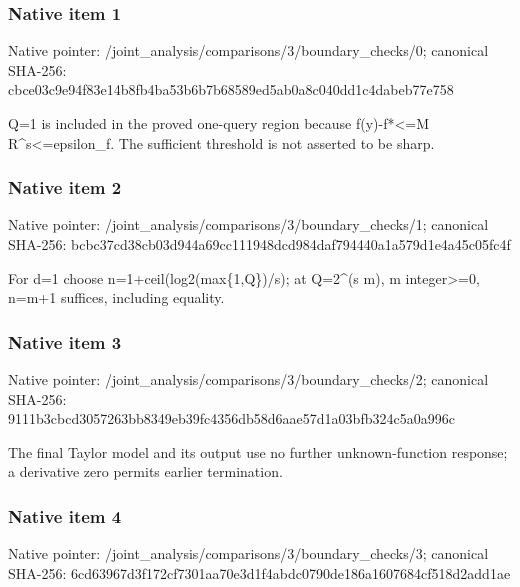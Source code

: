 \documentclass[10pt,a4paper]{article}
\begin{document}
\subsubsection{Native item 1}
Native pointer: /joint\_\allowbreak{}analysis/comparisons/3/boundary\_\allowbreak{}checks/0; canonical SHA-256: cbce03c9e94f83e14b8fb4ba53b6b7b68589ed5ab0a8c040dd1c4dabeb77e758

\begingroup\raggedright\sloppy Q=\allowbreak{}1 is included in the proved one-query region because f(y)-f*<=\allowbreak{}M R\textasciicircum{}s<=\allowbreak{}epsilon\_\allowbreak{}f. The sufficient threshold is not asserted to be sharp.\par\endgroup

\subsubsection{Native item 2}
Native pointer: /joint\_\allowbreak{}analysis/comparisons/3/boundary\_\allowbreak{}checks/1; canonical SHA-256: bcbc37cd38cb03d944a69cc111948dcd984daf794440a1a579d1e4a45c05fc4f

\begingroup\raggedright\sloppy For d=\allowbreak{}1 choose n=\allowbreak{}1+ceil(log2(max\{1,\allowbreak{}Q\})/\allowbreak{}s);\allowbreak{} at Q=\allowbreak{}2\textasciicircum{}(s m),\allowbreak{} m integer>=\allowbreak{}0,\allowbreak{} n=\allowbreak{}m+1 suffices,\allowbreak{} including equality.\par\endgroup

\subsubsection{Native item 3}
Native pointer: /joint\_\allowbreak{}analysis/comparisons/3/boundary\_\allowbreak{}checks/2; canonical SHA-256: 9111b3cbcd3057263bb8349eb39fc4356db58d6aae57d1a03bfb324c5a0a996c

\begingroup\raggedright\sloppy The final Taylor model and its output use no further unknown-function response;\allowbreak{} a derivative zero permits earlier termination.\par\endgroup

\subsubsection{Native item 4}
Native pointer: /joint\_\allowbreak{}analysis/comparisons/3/boundary\_\allowbreak{}checks/3; canonical SHA-256: 6cd63967d3f172cf7301aa70e3d1f4abdc0790de186a1607684cf518d2add1ae
\end{document}
